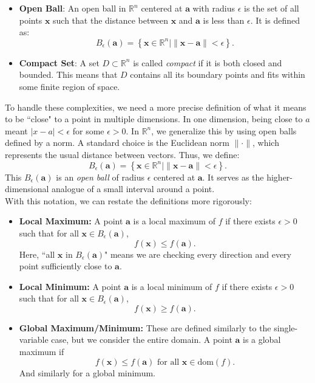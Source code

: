 \begin{itemize}
    
    \item \textbf{Open Ball}: An open ball in \( \mathbb{R}^n \) centered at \( \mathbf{a} \) with radius \( \epsilon \) is the set of all points \( \mathbf{x} \) such that the distance between \( \mathbf{x} \) and \( \mathbf{a} \) is less than \( \epsilon \). It is defined as:
    \[
    B_{\epsilon}(\mathbf{a}) = \left\{ \mathbf{x} \in \mathbb{R}^n \mid \|\mathbf{x} - \mathbf{a}\| < \epsilon \right\}.
    \]
    
    \item \textbf{Compact Set}:  A set \( D \subset \mathbb{R}^n \) is called \textit{compact} if it is both closed and bounded. This means that \( D \) contains all its boundary points and fits within some finite region of space.
\end{itemize}

\noindent To handle these complexities, we need a more precise definition of what it means to be ``close" to a point in multiple dimensions. In one dimension, being close to \( a \) meant \( |x - a| < \epsilon \) for some \(\epsilon > 0\). In \(\mathbb{R}^n\), we generalize this by using open balls defined by a norm. A standard choice is the Euclidean norm \( \|\cdot\| \), which represents the usual distance between vectors. Thus, we define:
\[
B_{\epsilon}(\mathbf{a}) = \left\{ \mathbf{x} \in \mathbb{R}^n \mid \|\mathbf{x} - \mathbf{a}\| < \epsilon \right\}.
\]
This \( B_{\epsilon}(\mathbf{a}) \) is an \textit{open ball} of radius \(\epsilon\) centered at \( \mathbf{a} \). It serves as the higher-dimensional analogue of a small interval around a point.
\\

\noindent With this notation, we can restate the definitions more rigorously:
\begin{itemize}
    \item \textbf{Local Maximum:} A point \(\mathbf{a}\) is a local maximum of \( f \) if there exists \(\epsilon >0\) such that for all \(\mathbf{x} \in B_{\epsilon}(\mathbf{a})\),
    \[
    f(\mathbf{x}) \leq f(\mathbf{a}).
    \]
    Here, ``all \(\mathbf{x}\) in \( B_{\epsilon}(\mathbf{a})\)" means we are checking every direction and every point sufficiently close to \(\mathbf{a}\).

    \item \textbf{Local Minimum:} A point \(\mathbf{a}\) is a local minimum of \( f \) if there exists \(\epsilon > 0\) such that for all \(\mathbf{x} \in B_{\epsilon}(\mathbf{a})\),
    \[
    f(\mathbf{x}) \geq f(\mathbf{a}).
    \]

    \item \textbf{Global Maximum/Minimum:} These are defined similarly to the single-variable case, but we consider the entire domain. A point \(\mathbf{a}\) is a global maximum if
    \[
    f(\mathbf{x}) \leq f(\mathbf{a}) \text{ for all } \mathbf{x} \in \text{dom}(f).
    \]
    And similarly for a global minimum.
\end{itemize}

